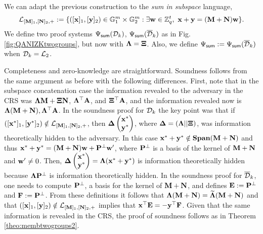 We can adapt the previous construction to the \textit{sum in subspace} language, 
 $$\mathcal{L}_{[\mathbf{{M}}]_1,[\mathbf{{N}}]_2,+}:=\{ ([\mathbf{x}]_1,[\mathbf{y}]_2) \in \mathbb{G}_1^{m} \times \mathbb{G}_2^{m} :  \exists \mathbf{w} \in \mathbb{Z}_q^{t}, \  \mathbf{x}+\mathbf{y}=(\mathbf{{M}}+\mathbf{{N}}) \mathbf{w}\}.$$
 We define two proof systems $\Psi_{\mathsf{sum}}(\mathcal{D}_k)$, $\Psi_{\mathsf{sum}}(\overline{\mathcal{D}}_k)$ as in Fig. \ref{fig:QANIZKtwogroups}, but now 
with $\mathbf{{\Lambda}}=\mathbf{{\Xi}}$. Also, we define $\Psi_{\mathsf{sum}}:=\Psi_{\mathsf{sum}}(\overline{\mathcal{D}}_k)$ when $\mathcal{D}_k=\mathcal{L}_2$.

Completeness and zero-knowledge are straightforward. Soundness follows from the same argument as before with the following differences. First, note that in the subspace concatenation case the information revealed to the adversary in the CRS was $\mathbf{{\Lambda}}\mathbf{{M}}+\mathbf{{\Xi}}\mathbf{{N}}$, $\mathbf{{\Lambda}}^\top\mathbf{{A}}$, and $\mathbf{{\Xi}}^\top\mathbf{{A}}$, and the information revealed now is $\mathbf{{\Lambda}}(\mathbf{{M}}+\mathbf{{N}}),\mathbf{{\Lambda}}^{\top}\mathbf{{A}}$. In the soundness proof for $\mathcal{D}_k$ the key point was that if $([\mathbf{x}^*]_1,[\mathbf{y}^*]_2)\notin\mathcal{L}_{[\mathbf{{M}}]_1,[\mathbf{{N}}]_2,+}$, then $\mathbf{{\Delta}}\left(\begin{matrix}\mathbf{x}^*\\\mathbf{y}^*\end{matrix}\right)$, where $\mathbf{{\Delta}}=(\mathbf{{\Lambda}}||\mathbf{{\Xi}})$, was information theoretically hidden to the adversary. In this case $\mathbf{x}^*+\mathbf{y}^*\notin\mathbf{Span}(\mathbf{{M}}+\mathbf{{N}})$ and thus $\mathbf{x}^*+\mathbf{y}^*=(\mathbf{{M}}+\mathbf{{N}})\mathbf{w}+\mathbf{{P}}^\bot\mathbf{w}'$, where $\mathbf{{P}}^\bot$ is a basis of the kernel of $\mathbf{{M}}+\mathbf{{N}}$ and $\mathbf{w}'\neq 0$. Then, $\mathbf{{\Delta}}\left(\begin{matrix}\mathbf{x}^*\\\mathbf{y}^*\end{matrix}\right)=\mathbf{{\Lambda}}(\mathbf{x}^*+\mathbf{y}^*)$ is information theoretically hidden because $\mathbf{{\Lambda}}\mathbf{{P}}^\bot$ is information theoretically hidden. In the soundness proof for $\overline{\mathcal{D}}_k$, one needs to compute $\mathbf{{P}}^\bot$, a basis for the kernel of $\mathbf{{M}}+\mathbf{{N}}$, and defines $\mathbf{{E}}:=\mathbf{{P}}^\bot$ and $\mathbf{{F}}:=\mathbf{{P}}^\bot$. From these definitions it follows that $\mathbf{{\Lambda}}(\mathbf{{M}}+\mathbf{{N}})=\widetilde{\mathbf{{\Lambda}}}(\mathbf{{M}}+\mathbf{{N}})$ and that $([\mathbf{x}]_1,[\mathbf{y}]_2)\notin\mathcal{L}_{[\mathbf{{M}}]_1,[\mathbf{{N}}]_2,+}$ implies that $\mathbf{x}^\top\mathbf{{E}}=-\mathbf{y}^\top\mathbf{{F}}$. Given that the same information is revealed in the CRS, the proof of soundness follows as in Theorem \ref{theo:membtwogroups2}.

